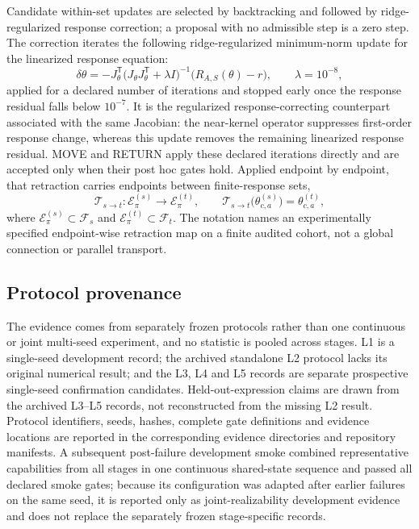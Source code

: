 \documentclass[11pt]{article}
\begin{document}
Candidate within-set updates are selected by backtracking and followed by ridge-regularized response
correction; a proposal with no admissible step is a zero step. The correction iterates the following
ridge-regularized minimum-norm update for the linearized response equation:
\begin{equation}
\delta\theta=-J_\theta^{\mathsf{T}}\bigl(J_\theta J_\theta^{\mathsf{T}}+\lambda I\bigr)^{-1}
\bigl(R_{A,S}(\theta)-r\bigr),\qquad \lambda=10^{-8},
\end{equation}
applied for a declared number of iterations and stopped early once the response residual falls below
$10^{-7}$. It is the regularized response-correcting counterpart associated with the same Jacobian: the
near-kernel operator suppresses first-order response change, whereas this update removes the remaining
linearized response residual. MOVE and RETURN apply these declared iterations directly and are
accepted only when their post hoc gates hold. Applied endpoint
by endpoint, that retraction carries endpoints between finite-response sets,
\begin{equation}
\mathcal{T}_{s\to t}:\mathcal{E}^{(s)}_\pi\longrightarrow\mathcal{E}^{(t)}_\pi,\qquad
\mathcal{T}_{s\to t}\bigl(\theta^{(s)}_{c,a}\bigr)=\theta^{(t)}_{c,a},
\end{equation}
where $\mathcal{E}^{(s)}_\pi\subset\mathcal{F}_s$ and $\mathcal{E}^{(t)}_\pi\subset\mathcal{F}_t$. The
notation names an experimentally specified endpoint-wise retraction map on a finite audited cohort, not a
global connection or parallel transport.

\subsection{Protocol provenance}

The evidence comes from separately frozen protocols rather than one continuous
or joint multi-seed experiment, and no statistic is pooled across stages. L1 is
a single-seed development record; the archived standalone L2 protocol lacks
its original numerical result; and the L3, L4 and L5 records are separate
prospective single-seed confirmation candidates. Held-out-expression claims
are drawn from the archived L3--L5 records, not reconstructed from the missing
L2 result. Protocol identifiers, seeds, hashes, complete gate definitions and
evidence locations are reported in the corresponding evidence directories and repository manifests. A
subsequent post-failure development smoke combined representative capabilities from all stages in one
continuous shared-state sequence and passed all declared smoke gates; because its configuration was adapted
after earlier failures on the same seed, it is reported only as joint-realizability development evidence and
does not replace the separately frozen stage-specific records.
\end{document}
